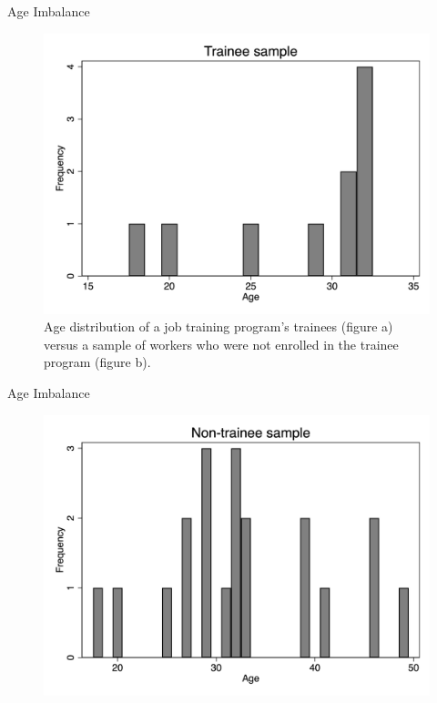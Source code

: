 \documentclass{beamer}
\begin{document}
\begin{frame}{Age Imbalance}

\begin{figure}[!t]\centering
\caption{Age distribution of a job training program's trainees (figure a) versus a sample of workers who were not enrolled in the trainee program (figure b).}
\includegraphics[scale=0.075]{./lecture_includes/trainees.jpg}
\end{figure}

\end{frame}

\begin{frame}{Age Imbalance}

\begin{figure}[!t]\centering
\includegraphics[scale=0.075]{./lecture_includes/nontrainees}
\end{figure}

\end{frame}
\end{document}
